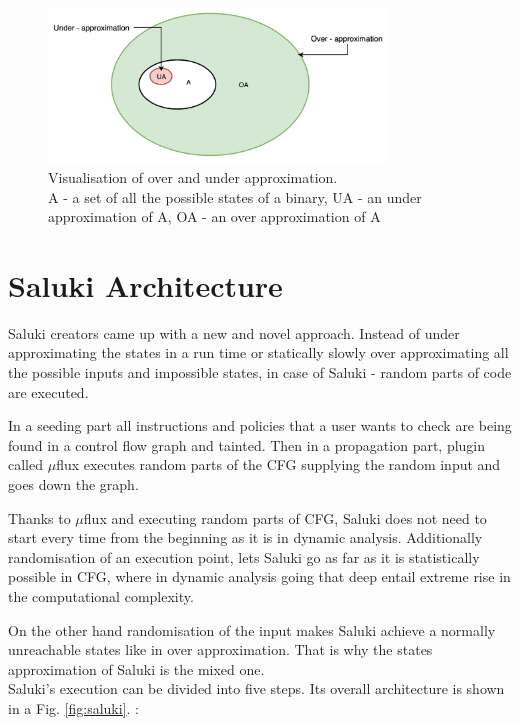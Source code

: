 \documentclass[a4paper, 12pt, journal, onecolumn]{IEEEtran}
\begin{document}
\begin{figure}[ht]
    \centering
    \captionsetup{justification=centering}
    \includegraphics[width=0.8\textwidth]{approximation.png}
    \caption{Visualisation of over and under approximation. \\ A - a set of all the possible states of a binary, UA - an under approximation of A, OA - an over approximation of A \cite{a3} }
    \label{fig:approximation}
\end{figure}

\pagebreak

\section{Saluki Architecture}

Saluki creators came up with a new and novel approach. Instead of under approximating the states in a run time or statically slowly over approximating all the possible inputs and impossible states, in case of Saluki - random parts of code are executed. 

In a seeding part all instructions and policies that a user wants to check are being found in a control flow graph and tainted. Then in a propagation part, plugin called $\mu$flux executes random parts of the CFG supplying the random input and goes down the graph. 

Thanks to $\mu$flux and executing random parts of CFG, Saluki does not need to start every time from the beginning as it is in dynamic analysis. Additionally randomisation of an execution point, lets Saluki go as far as it is statistically possible in CFG, where in dynamic analysis going that deep entail extreme rise in the computational complexity. 

On the other hand randomisation of the input makes Saluki achieve a normally unreachable states like in over approximation. That is why the states approximation of Saluki is the mixed one.\cite{a4}
\\

Saluki's execution can be divided into five steps.
Its overall architecture is shown in a Fig. \ref{fig:saluki}.  \cite{saluki} :
\end{document}
